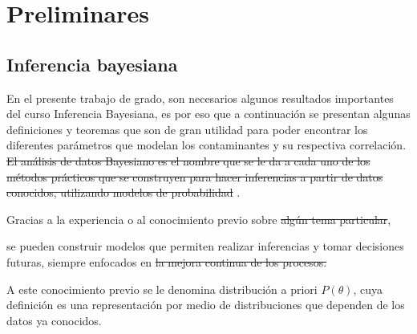 \chapter{Preliminares}

\section{Inferencia bayesiana}
En el presente trabajo de grado, son necesarios algunos resultados importantes del curso Inferencia Bayesiana, es por eso que a continuación se presentan algunas definiciones y teoremas que son de gran utilidad para poder encontrar los diferentes parámetros que modelan los contaminantes y su respectiva correlación.\\




\st{El an\'alisis de datos Bayesiano es el nombre que se le da a cada uno de los m\'etodos pr\'acticos que se construyen para hacer inferencias a partir de datos conocidos, utilizando modelos de probabilidad} \cite{infe_bayes}.
\begin{comment} 
Rehacer la frase, está bastante imprecisa
\end{comment}
Gracias a la experiencia o al conocimiento previo sobre \st{alg\'un tema particular}, 
\begin{comment} 
	Se vuelve difícil de entender cuando dices que sobre un tema particular.
\end{comment}
se pueden construir modelos que permiten realizar inferencias y tomar decisiones futuras, siempre enfocados en \st{la mejora continua de los procesos.}
\begin{comment} 
	Qué procesos?. No es clara para nada tu definición.
\end{comment}


A este conocimiento previo se le denomina distribución a priori $P(\theta)$, cuya definición es una representación por medio de distribuciones que dependen de los datos ya conocidos. \\

